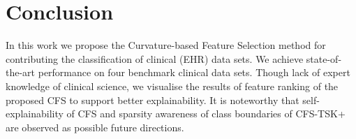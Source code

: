 \documentclass{article}
\newcommand*{\1}{\textcolor{red}}
\begin{document}
\section{Conclusion} \label{sec:concl}
In this work we propose the Curvature-based Feature Selection method for contributing the classification of clinical (EHR) data sets. We achieve state-of-the-art performance on four benchmark clinical data sets. Though lack of expert knowledge of clinical science, we visualise the results of feature ranking of the proposed CFS to support better explainability. It is noteworthy that self-explainability of CFS and sparsity awareness of class boundaries of CFS-TSK+ are observed as possible future directions.


  
 
\end{document}
